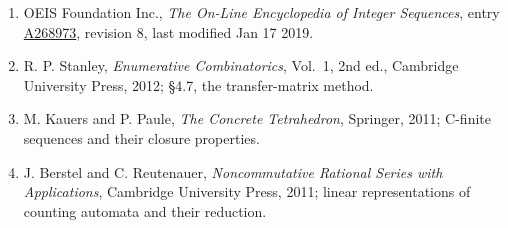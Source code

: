 \documentclass[11pt]{article}
\theoremstyle{definition}
\begin{document}
\begin{enumerate}

\item OEIS Foundation Inc., \emph{The On-Line Encyclopedia of Integer Sequences}, entry \href{https://oeis.org/A268973}{A268973}, revision 8, last modified Jan 17 2019.

\item R. P. Stanley, \emph{Enumerative Combinatorics}, Vol.~1, 2nd ed., Cambridge University Press, 2012; \S4.7, the transfer-matrix method.

\item M. Kauers and P. Paule, \emph{The Concrete Tetrahedron}, Springer, 2011; C-finite sequences and their closure properties.

\item J. Berstel and C. Reutenauer, \emph{Noncommutative Rational Series with Applications}, Cambridge University Press, 2011; linear representations of counting automata and their reduction.

\end{enumerate}
\end{document}
